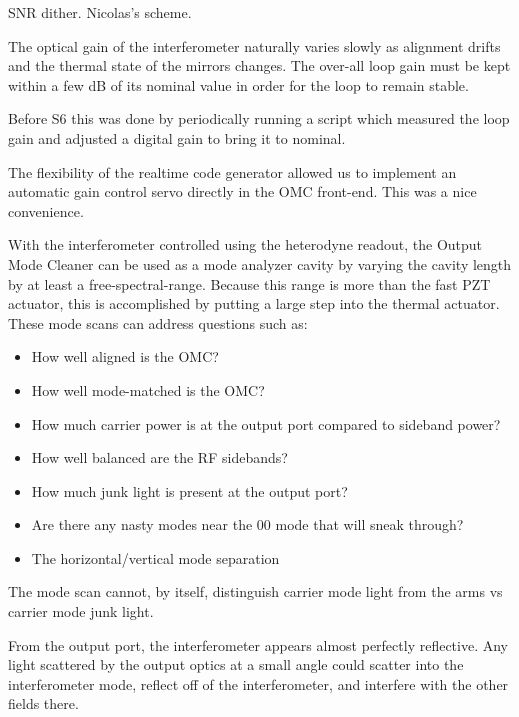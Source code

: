 SNR dither.  Nicolas's scheme.


The optical gain of the interferometer naturally varies slowly as
alignment drifts and the thermal state of the mirrors changes.  The
over-all loop gain must be kept within a few dB of its nominal value
in order for the loop to remain stable.

Before S6 this was done by periodically running a script which
measured the loop gain and adjusted a digital gain to bring it to
nominal.

The flexibility of the realtime code generator allowed us to implement
an automatic gain control servo directly in the OMC front-end.  This
was a nice convenience. 




With the interferometer controlled using the heterodyne readout, the
Output Mode Cleaner can be used as a mode analyzer cavity by varying
the cavity length by at least a free-spectral-range. Because this
range is more than the fast PZT actuator, this is accomplished by
putting a large step into the thermal actuator. These mode scans can
address questions such as:
\begin{itemize}
\item How well aligned is the OMC?
\item How well mode-matched is the OMC?
\item How much carrier power is at the output port compared to sideband
power?
\item How well balanced are the RF sidebands?
\item How much junk light is present at the output port?
\item Are there any nasty modes near the 00 mode that will sneak through?
\item The horizontal/vertical mode separation
\end{itemize}
The mode scan cannot, by itself, distinguish carrier mode light from
the arms vs carrier mode junk light.



From the output port, the interferometer appears almost perfectly
reflective.  Any light scattered by the output optics at a small angle
could scatter into the interferometer mode, reflect off of the
interferometer, and interfere with the other fields there.


